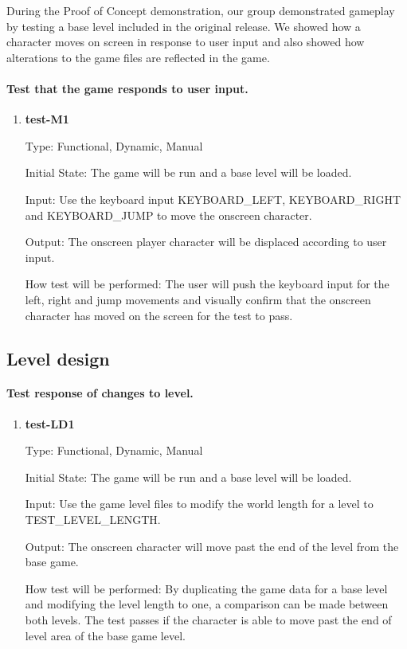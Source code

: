 \documentclass[12pt, titlepage]{article}
\begin{document}
During the Proof of Concept demonstration, our group demonstrated gameplay by testing a base level included in the original release. We showed how a character moves on screen in response to user input and also showed how alterations to the game files are reflected in the game.

\paragraph{Test that the game responds to user input.}

\begin{enumerate}

\item{\textbf{test-M1\\}}

Type: Functional, Dynamic, Manual
					
Initial State: The game will be run and a base level will be loaded.
					
Input: Use the keyboard input KEYBOARD\_LEFT, KEYBOARD\_RIGHT and KEYBOARD\_JUMP         to move the onscreen character.
					
Output: The onscreen player character will be displaced according to user input.
					
How test will be performed: The user will push the keyboard input for the left, right and jump movements and visually confirm that the onscreen character has moved on the screen for the test to pass.

\end{enumerate}

\subsection{Level design}

\paragraph{Test response of changes to level.}

\begin{enumerate}

\item{\textbf{test-LD1\\}}

Type: Functional, Dynamic, Manual
					
Initial State: The game will be run and a base level will be loaded.
					
Input: Use the game level files to modify the world length for a level to TEST\_LEVEL\_LENGTH. 
					
Output: The onscreen character will move past the end of the level from the base game.
					
How test will be performed: By duplicating the game data for a base level and modifying the level length to one, a comparison can be made between both levels. The test passes if the character is able to move past the end of level area of the base game level.

\end{enumerate}
	
\end{document}
